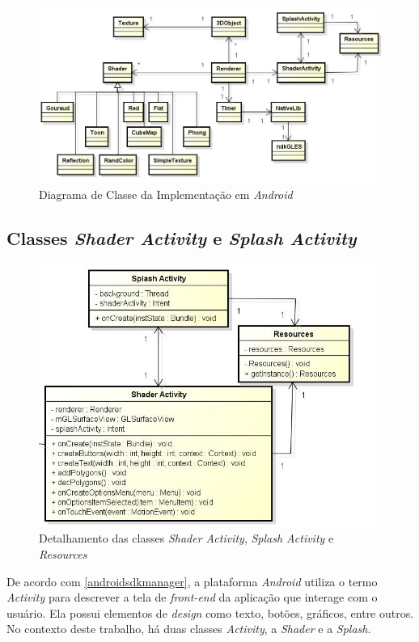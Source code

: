 	\begin{figure}[h]
	\centering
		\includegraphics[keepaspectratio=true,scale=0.6]{figuras/class_diagram.jpg}
	\caption{Diagrama de Classe da Implementação em \textit{Android}}
	\label{class_diagram}
	\end{figure}

\subsection{Classes \textit{Shader Activity} e \textit{Splash Activity}}

	\begin{figure}[h]
	\centering
		\includegraphics[keepaspectratio=true,scale=0.6]{figuras/shader_splash.jpg}
	\caption{Detalhamento das classes \textit{Shader Activity}, \textit{Splash Activity} e \textit{Resources}}
	\label{shader_splash}
	\end{figure}

	De acordo com \ref{androidsdkmanager}, a plataforma \textit{Android} utiliza o termo \textit{Activity} para descrever a tela de \textit{front-end} da aplicação que interage com o usuário. Ela possui elementos de \textit{design} como texto, botões, gráficos, entre outros. No contexto deste trabalho, há duas classes \textit{Activity}, a \textit{Shader} e a \textit{Splash}. 

